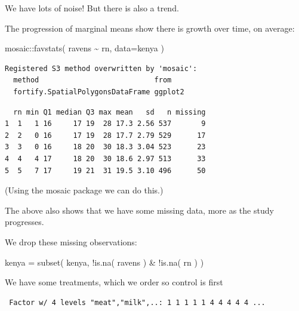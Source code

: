 \documentclass[
  letterpaper,
  DIV=11,
  numbers=noendperiod]{scrreprt}
\newenvironment{Shaded}{}{}
\newcommand{\AttributeTok}[1]{\textcolor[rgb]{0.49,0.56,0.16}{#1}}
\newcommand{\FunctionTok}[1]{\textcolor[rgb]{0.02,0.16,0.49}{#1}}
\newcommand{\NormalTok}[1]{#1}
\newcommand{\OtherTok}[1]{\textcolor[rgb]{0.00,0.44,0.13}{#1}}
\newcommand{\SpecialCharTok}[1]{\textcolor[rgb]{0.25,0.44,0.63}{#1}}
\begin{document}
We have lots of noise! But there is also a trend.

The progression of marginal means show there is growth over time, on
average:

\begin{Shaded}
\begin{Highlighting}[]
\NormalTok{mosaic}\SpecialCharTok{::}\FunctionTok{favstats}\NormalTok{( ravens }\SpecialCharTok{\textasciitilde{}}\NormalTok{ rn, }\AttributeTok{data=}\NormalTok{kenya )}
\end{Highlighting}
\end{Shaded}

\begin{verbatim}
Registered S3 method overwritten by 'mosaic':
  method                           from   
  fortify.SpatialPolygonsDataFrame ggplot2
\end{verbatim}

\begin{verbatim}
  rn min Q1 median Q3 max mean   sd   n missing
1  1   1 16     17 19  28 17.3 2.56 537       9
2  2   0 16     17 19  28 17.7 2.79 529      17
3  3   0 16     18 20  30 18.3 3.04 523      23
4  4   4 17     18 20  30 18.6 2.97 513      33
5  5   7 17     19 21  31 19.5 3.10 496      50
\end{verbatim}

(Using the mosaic package we can do this.)

The above also shows that we have some missing data, more as the study
progresses.

We drop these missing observations:

\begin{Shaded}
\begin{Highlighting}[]
\NormalTok{kenya }\OtherTok{=} \FunctionTok{subset}\NormalTok{( kenya, }\SpecialCharTok{!}\FunctionTok{is.na}\NormalTok{( ravens ) }\SpecialCharTok{\&} \SpecialCharTok{!}\FunctionTok{is.na}\NormalTok{( rn ) )}
\end{Highlighting}
\end{Shaded}

We have some treatments, which we order so control is first

\begin{Shaded}
\end{Shaded}

\begin{verbatim}
 Factor w/ 4 levels "meat","milk",..: 1 1 1 1 1 4 4 4 4 4 ...
\end{verbatim}
\end{document}
